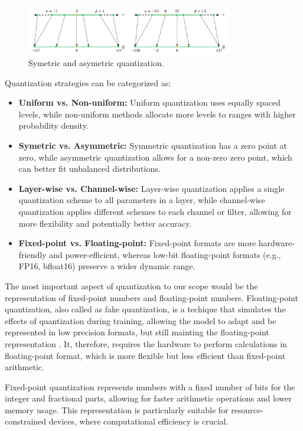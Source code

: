 \newpage
\begin{figure}
\centering
\includegraphics[width=0.8\textwidth]{figuras/2-fundamentos/quantization symetric.png}
\caption{Symetric and asymetric quantization.}
\label{fig:symmetric_quantization}
\end{figure}


Quantization strategies can be categorized as:
\begin{itemize}
    \item \textbf{Uniform vs. Non-uniform:} Uniform quantization uses equally spaced levels, while non-uniform methods allocate more levels to ranges with higher probability density.
    \item \textbf{Symetric vs. Asymmetric:} Symmetric quantization has a zero point at zero, while asymmetric quantization allows for a non-zero zero point, which can better fit unbalanced distributions.
    \item \textbf{Layer-wise vs. Channel-wise:} Layer-wise quantization applies a single quantization scheme to all parameters in a layer, while channel-wise quantization applies different schemes to each channel or filter, allowing for more flexibility and potentially better accuracy.
    \item \textbf{Fixed-point vs. Floating-point:} Fixed-point formats are more hardware-friendly and power-efficient, whereas low-bit floating-point formats (e.g., FP16, bfloat16) preserve a wider dynamic range.
\end{itemize}


The most important aspect of quantization to our scope would be the representation of fixed-point numbers and floating-point numbers. Floating-point quantization, also called as fake quantization, is a techique that simulates the effects of quantization during training, allowing the model to adapt and be represented in low precision formats, but still mainting the floating-point representation \cite{Zhu2020Survey}. It, therefore, requires the hardware to perform calculations in floating-point format, which is more flexible but less efficient than fixed-point arithmetic.

Fixed-point quantization represents numbers with a fixed number of bits for the integer and fractional parts, allowing for faster arithmetic operations and lower memory usage. This representation is particularly suitable for resource-constrained devices, where computational efficiency is crucial.

